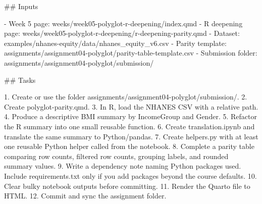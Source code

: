 \documentclass[
  letterpaper,
  DIV=11,
  numbers=noendperiod,
  oneside]{scrreprt}
\newenvironment{Shaded}{\begin{snugshade}}{\end{snugshade}}
\newcommand{\FunctionTok}[1]{\textcolor[rgb]{0.28,0.35,0.67}{#1}}
\newcommand{\InformationTok}[1]{\textcolor[rgb]{0.37,0.37,0.37}{#1}}
\newcommand{\NormalTok}[1]{\textcolor[rgb]{0.00,0.23,0.31}{#1}}
\newcommand{\SpecialStringTok}[1]{\textcolor[rgb]{0.13,0.47,0.30}{#1}}
\begin{document}
\begin{Shaded}
\begin{Highlighting}[numbers=left,,]
\FunctionTok{\#\# Inputs}

\SpecialStringTok{{-} }\NormalTok{Week 5 page: }\InformationTok{\textasciigrave{}weeks/week05{-}polyglot{-}r{-}deepening/index.qmd\textasciigrave{}}
\SpecialStringTok{{-} }\NormalTok{R deepening page: }\InformationTok{\textasciigrave{}weeks/week05{-}polyglot{-}r{-}deepening/r{-}deepening{-}parity.qmd\textasciigrave{}}
\SpecialStringTok{{-} }\NormalTok{Dataset: }\InformationTok{\textasciigrave{}examples/nhanes{-}equity/data/nhanes\_equity\_v6.csv\textasciigrave{}}
\SpecialStringTok{{-} }\NormalTok{Parity template: }\InformationTok{\textasciigrave{}assignments/assignment04{-}polyglot/parity{-}table{-}template.csv\textasciigrave{}}
\SpecialStringTok{{-} }\NormalTok{Submission folder: }\InformationTok{\textasciigrave{}assignments/assignment04{-}polyglot/submission/\textasciigrave{}}

\FunctionTok{\#\# Tasks}

\SpecialStringTok{1. }\NormalTok{Create or use the folder }\InformationTok{\textasciigrave{}assignments/assignment04{-}polyglot/submission/\textasciigrave{}}\NormalTok{.}
\SpecialStringTok{2. }\NormalTok{Create }\InformationTok{\textasciigrave{}polyglot{-}parity.qmd\textasciigrave{}}\NormalTok{.}
\SpecialStringTok{3. }\NormalTok{In R, load the NHANES CSV with a relative path.}
\SpecialStringTok{4. }\NormalTok{Produce a descriptive BMI summary by }\InformationTok{\textasciigrave{}IncomeGroup\textasciigrave{}}\NormalTok{ and }\InformationTok{\textasciigrave{}Gender\textasciigrave{}}\NormalTok{.}
\SpecialStringTok{5. }\NormalTok{Refactor the R summary into one small reusable function.}
\SpecialStringTok{6. }\NormalTok{Create }\InformationTok{\textasciigrave{}translation.ipynb\textasciigrave{}}\NormalTok{ and translate the same summary to Python/pandas.}
\SpecialStringTok{7. }\NormalTok{Create }\InformationTok{\textasciigrave{}helpers.py\textasciigrave{}}\NormalTok{ with at least one reusable Python helper called from the notebook.}
\SpecialStringTok{8. }\NormalTok{Complete a parity table comparing row counts, filtered row counts, grouping labels, and rounded summary values.}
\SpecialStringTok{9. }\NormalTok{Write a dependency note naming Python packages used. Include }\InformationTok{\textasciigrave{}requirements.txt\textasciigrave{}}\NormalTok{ only if you add packages beyond the course defaults.}
\SpecialStringTok{10. }\NormalTok{Clear bulky notebook outputs before committing.}
\SpecialStringTok{11. }\NormalTok{Render the Quarto file to HTML.}
\SpecialStringTok{12. }\NormalTok{Commit and sync the assignment folder.}


\end{Highlighting}
\end{Shaded}
\end{document}
